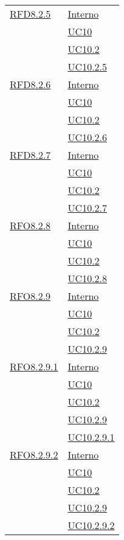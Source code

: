 \begin{longtable}{|>{\centering}m{5cm}|m{5cm}<{\centering}|}
 \hyperlink{RFD8.2.5}{RFD8.2.5} 
 & \hyperlink{Interno}{Interno}\\
 & \hyperref[UC10]{UC10}\\
 & \hyperref[UC10.2]{UC10.2}\\
 & \hyperref[UC10.2.5]{UC10.2.5}\\\hline
 
 \hyperlink{RFD8.2.6}{RFD8.2.6} 
 & \hyperlink{Interno}{Interno}\\
 & \hyperref[UC10]{UC10}\\
 & \hyperref[UC10.2]{UC10.2}\\
 & \hyperref[UC10.2.6]{UC10.2.6}\\\hline
 
 \hyperlink{RFD8.2.7}{RFD8.2.7} 
 & \hyperlink{Interno}{Interno}\\
 & \hyperref[UC10]{UC10}\\
 & \hyperref[UC10.2]{UC10.2}\\
 & \hyperref[UC10.2.7]{UC10.2.7}\\\hline
 
 \hyperlink{RFO8.2.8}{RFO8.2.8} 
 & \hyperlink{Interno}{Interno}\\
 & \hyperref[UC10]{UC10}\\
 & \hyperref[UC10.2]{UC10.2}\\
 & \hyperref[UC10.2.8]{UC10.2.8}\\\hline
 
 \hyperlink{RFO8.2.9}{RFO8.2.9} 
 & \hyperlink{Interno}{Interno}\\
 & \hyperref[UC10]{UC10}\\
 & \hyperref[UC10.2]{UC10.2}\\
 & \hyperref[UC10.2.9]{UC10.2.9}\\\hline
 
 \hyperlink{RFO8.2.9.1}{RFO8.2.9.1} 
 & \hyperlink{Interno}{Interno}\\
 & \hyperref[UC10]{UC10}\\
 & \hyperref[UC10.2]{UC10.2}\\
 & \hyperref[UC10.2.9]{UC10.2.9}\\
 & \hyperref[UC10.2.9.1]{UC10.2.9.1}\\\hline
 
\hyperlink{RFO8.2.9.2}{RFO8.2.9.2} 
 & \hyperlink{Interno}{Interno}\\
 & \hyperref[UC10]{UC10}\\
 & \hyperref[UC10.2]{UC10.2}\\
 & \hyperref[UC10.2.9]{UC10.2.9}\\
 & \hyperref[UC10.2.9.2]{UC10.2.9.2}\\\hline
 

\end{longtable}

